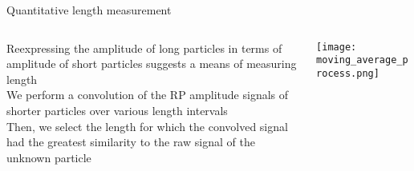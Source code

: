 \begin{frame}[c]{Quantitative length measurement}
	
	\begin{columns}[t]
		\begin{column}[T]{2.25in}
			{\footnotesize
				Reexpressing the amplitude of long particles in terms of amplitude of short particles suggests a means of measuring length \\
				\vspace{.2in}
				We perform a convolution of the RP amplitude signals of shorter particles over various length intervals \\
				\vspace{.2in}
				Then, we select the length for which the convolved signal had the greatest similarity to the raw signal of the unknown particle
			}
		\end{column}
		
		\begin{column}[T]{2.25in}
			\texttt{[image: moving\_average\_process.png]}
		\end{column}


	\end{columns}
\end{frame}






